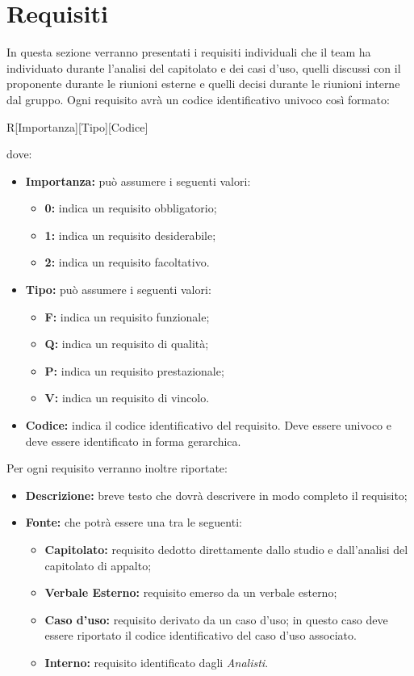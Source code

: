 \documentclass[../AnalisiDeiRequisiti.tex]{subfiles}
\begin{document}
\section{Requisiti}
In questa sezione verranno presentati i requisiti individuali che il team ha individuato durante l'analisi del capitolato e dei casi d'uso, quelli discussi con il proponente durante le riunioni esterne e quelli decisi durante le riunioni interne dal gruppo. 
Ogni requisito avrà un codice identificativo univoco così formato:

\begin{center} R[{Importanza}][{Tipo}][{Codice}] \end{center}

dove:
\begin{itemize}
	\item \textbf{Importanza:} può assumere i seguenti valori:
	\begin{itemize}
		\item \textbf{0:} indica un requisito obbligatorio;
		\item \textbf{1:} indica un requisito desiderabile;
		\item \textbf{2:} indica un requisito facoltativo.
	\end{itemize}
	
	\item \textbf{Tipo:} può assumere i seguenti valori:
	\begin{itemize}
		\item \textbf{F:} indica un requisito funzionale;
		\item \textbf{Q:} indica un requisito di qualità;
		\item \textbf{P:} indica un requisito prestazionale;
		\item \textbf{V:} indica un requisito di vincolo.
	\end{itemize}
	
	\item \textbf{Codice:} indica il codice identificativo del requisito. Deve essere univoco e deve essere identificato in forma gerarchica.
\end{itemize}
Per ogni requisito verranno inoltre riportate:
\begin{itemize}
	\item \textbf{Descrizione:} breve testo che dovrà descrivere in modo completo il requisito;
	\item \textbf{Fonte:} che potrà essere una tra le seguenti:
	\begin{itemize}
		\item \textbf{Capitolato:} requisito dedotto direttamente dallo studio e dall'analisi del capitolato di appalto;
		\item \textbf{Verbale Esterno:} requisito emerso da un verbale esterno;
		\item \textbf{Caso d'uso:} requisito derivato  da un caso d'uso; in questo caso deve essere riportato il codice identificativo del caso d'uso associato.
		\item \textbf{Interno:} requisito identificato dagli \textit{Analisti}.
	\end{itemize}
\end{itemize}
\end{document}
